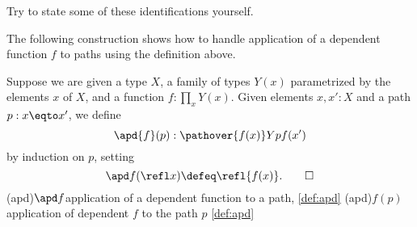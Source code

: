 \begin{xca}\label{xca:cp}
Try to state some of these identifications yourself.
\end{xca}

The following construction shows how to handle application of a dependent
function $f$ to paths using the definition above.

\begin{definition}\label{def:apd}
  Suppose we are given a type $X$, a family of types $Y(x)$ parametrized by the elements $x$ of $X$, and a function $f:\prod_x Y(x)$.
  Given elements $x,x':X$ and a path $p : x \eqto x'$, we define
  \[
    \apd{f}(p) : \pathover {f(x)} Y p {f(x')}
  \]
  by induction on $p$, setting
  \[
    \apd f {(\refl x)} \defeq \refl {f(x)}.\qedhere
    \]
    \glossary(apd){$\protect \apd f$}{application of a dependent function 
    to a path, \cref{def:apd}}
    \glossary(apd){$f(p)$}{application of dependent $f$ to the path $p$ \cref{def:apd}}
\end{definition}

